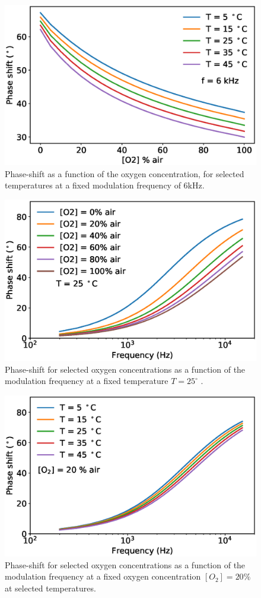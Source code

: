 \documentclass[9pt,twocolumn,twoside,pdftex]{optica}
\begin{document}
\begin{figure}[htbp]
\centering
\includegraphics[width=9 cm]{expdata3.eps}
\caption{Phase-shift as a function of the oxygen concentration, for selected temperatures at a fixed modulation frequency of 6kHz.}
\label{fig:expdata3}
\end{figure}

\begin{figure}[htbp]
\centering
\includegraphics[width=9 cm]{expdata1.eps}
\caption{Phase-shift for selected oxygen concentrations as a function of the modulation frequency at a fixed temperature $T=25 ^{\circ}$ .}
\label{fig:expdata1}
\end{figure}

\begin{figure}[htbp]
\centering
\includegraphics[width=9 cm]{expdata2.eps}
\caption{Phase-shift for selected oxygen concentrations as a function of the modulation frequency at a fixed oxygen concentration $[O_2]=20 \%$ at selected temperatures.}
\label{fig:expdata2}
\end{figure}
\end{document}
